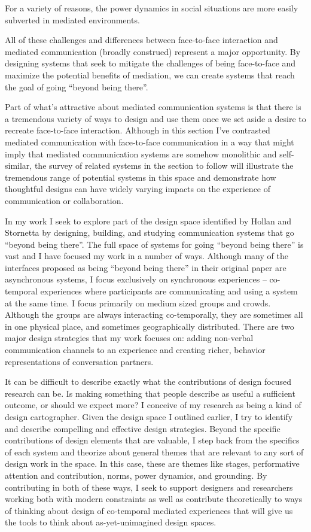 \documentclass{tufte-handout}
\begin{document}
For a variety of reasons, the power dynamics in social situations are more easily subverted in mediated environments. 

All of these challenges and differences between face-to-face interaction and mediated communication (broadly construed) represent a major opportunity. By designing systems that seek to mitigate the challenges of being face-to-face and maximize the potential benefits of mediation, we can create systems that reach the goal of going ``beyond being there''. 

Part of what's attractive about mediated communication systems is that there is a tremendous variety of ways to design and use them once we set aside a desire to recreate face-to-face interaction. Although in this section I've contrasted mediated communication with face-to-face communication in a way that might imply that mediated communication systems are somehow monolithic and self-similar, the survey of related systems in the section to follow will illustrate the tremendous range of potential systems in this space and demonstrate how thoughtful designs can have widely varying impacts on the experience of communication or collaboration. 

In my work I seek to explore part of the design space identified by Hollan and Stornetta by designing, building, and studying communication systems that go ``beyond being there''. The full space of systems for going ``beyond being there'' is vast and I have focused my work in a number of ways. Although many of the interfaces proposed as being ``beyond being there'' in their original paper are asynchronous systems, I focus exclusively on synchronous experiences -- co-temporal experiences where participants are communicating and using a system at the same time. I focus primarily on medium sized groups and crowds. Although the groups are always interacting co-temporally, they are sometimes all in one physical place, and sometimes geographically distributed. There are two major design strategies that my work focuses on: adding non-verbal communication channels to an experience and creating richer, behavior representations of conversation partners. 

It can be difficult to describe exactly what the contributions of design focused research can be. Is making something that people describe as useful a sufficient outcome, or should we expect more? I conceive of my research as being a kind of design cartographer. Given the design space I outlined earlier, I try to identify and describe compelling and effective design strategies. Beyond the specific contributions of design elements that are valuable, I step back from the specifics of each system and theorize about general themes that are relevant to any sort of design work in the space. In this case, these are themes like stages, performative attention and contribution, norms, power dynamics, and grounding. By contributing in both of these ways, I seek to support designers and researchers working both with modern constraints as well as contribute theoretically to ways of thinking about design of co-temporal mediated experiences that will give us the tools to think about as-yet-unimagined design spaces.
\end{document}
